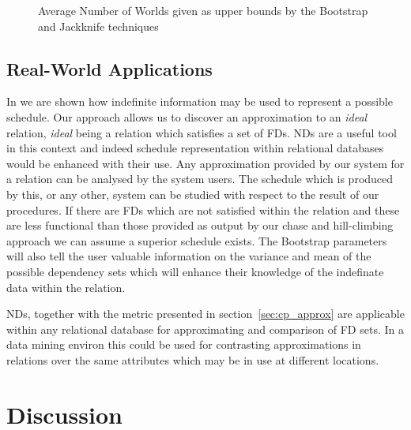 \begin{figure}
\centerline{}
\caption{\label{graph:bj1} {Average Number of Worlds given as 
upper bounds by the Bootstrap and Jackknife techniques}}
\end{figure}


\subsection{Real-World Applications}\label{sec:cp_apps}
 
In \cite{inv91} we are shown how indefinite information may be used to
represent a possible schedule. Our approach allows us to discover an
approximation to an {\em ideal} relation, {\em ideal} being a relation
which satisfies
a set of FDs. NDs are a useful tool in this context and indeed 
schedule representation within relational databases would be enhanced with
their use. Any approximation
provided by our system for a relation can be analysed by the system
users. The schedule which is produced by this, or any other, system can
be studied with respect to the result of our procedures. If there are
FDs which are not satisfied within the relation and these are less
functional than those provided as output by our chase and hill-climbing
approach we can assume a superior schedule exists. The Bootstrap
parameters will also tell the user valuable information on the
variance and mean of the possible dependency sets which will enhance
their knowledge of the indefinate data within the relation.

\medskip
 
NDs, together with the metric presented in section~\ref{sec:cp_approx} are applicable
within any relational database for approximating and comparison of FD sets.
In a data mining environ this could be used for contrasting approximations
in relations over the same attributes which may be in use at different
locations.




\section{Discussion}\label{sec:cp_disc}


